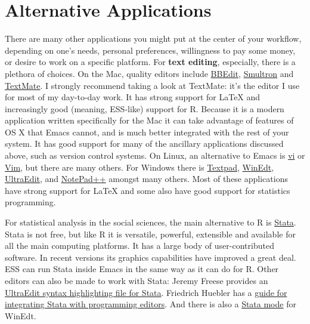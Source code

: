 \documentclass[11pt,article,oneside]{memoir}
\begin{document}
\chapter{Alternative Applications}
There are many other applications you might put at the center of your workflow, depending on one's needs, personal preferences, willingness to pay some money, or desire to work on a specific platform. For \textbf{text editing}, especially, there is a plethora of choices. On the Mac, quality editors  include
\href{http://www.barebones.com/products/bbedit/index.shtml}{BBEdit}, \href{http://smultron.sourceforge.net/}{Smultron} and \href{http://macromates.com/}{TextMate}. I strongly recommend taking a look at TextMate: it's the editor I use for most of my day-to-day work. It has strong support for LaTeX and increasingly good (meaning, ESS-like) support for R. Because it is a modern application written specifically for the Mac it can take advantage of features of OS X that Emacs cannot, and is much better integrated with the rest of your system. It has good support for many of the ancillary applications discussed above, such as version control systems. On Linux, an alternative to Emacs is \href{http://www.eng.hawaii.edu/Tutor/vi.html}{vi} or \href{http://www.vim.org/}{Vim}, but there are many others. For Windows there is \href{http://www.textpad.com/}{Textpad}, \href{http://www.winedt.com/}{WinEdt}, \href{http://www.ultraedit.com/}{UltraEdit}, and \href{http://notepad-plus.sourceforge.net/uk/site.htm}{NotePad++} amongst many others. Most of these applications have strong support for LaTeX and some also have good support for statistics programming.

For statistical analysis in the social sciences, the main alternative to R is \href{http://www.stata.com/}{Stata}. Stata is not free, but like R it is versatile, powerful, extensible and available for all the main computing platforms. It has a large body of user-contributed software. In recent versions its graphics capabilities have improved a great deal. ESS can run Stata inside Emacs in the same way as it can do for R. Other editors can also be made to work with Stata: Jeremy Freese provides an  \href{http://www.jeremyfreese.com/#other%20research}{UltraEdit syntax highlighting file for Stata}. Friedrich Huebler has a \href{http://mysite.verizon.net/huebler/2005/20050310_Stata_editor.html}{guide for integrating Stata with programming editors}. And there is also a \href{http://www.winedt.org/Config/modes/Stata.php}{Stata mode} for WinEdt.
\end{document}
